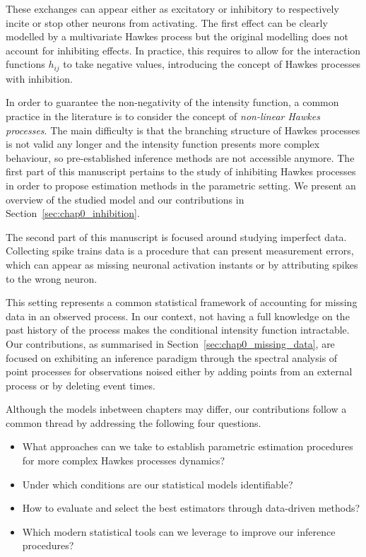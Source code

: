     These exchanges can appear either as excitatory or inhibitory to respectively incite or stop other neurons from activating.
    The first effect can be clearly modelled by a multivariate Hawkes process but the original modelling does not account for inhibiting effects.
    In practice, this requires to allow for the interaction functions $h_{ij}$ to take negative values, introducing the concept of Hawkes processes with inhibition.

    In order to guarantee the non-negativity of the intensity function, a common practice in the literature is to consider the concept of \emph{non-linear Hawkes processes}.
    The main difficulty is that the branching structure of Hawkes processes is not valid any longer and the intensity function presents more complex behaviour, so pre-established inference methods are not accessible anymore.
    The first part of this manuscript pertains to the study of inhibiting Hawkes processes in order to propose estimation methods in the parametric setting.
    We present an overview of the studied model and our contributions in Section~\ref{sec:chap0_inhibition}.
    
    The second part of this manuscript is focused around studying imperfect data.
    Collecting spike trains data is a procedure that can present measurement errors, which can appear as missing neuronal activation instants or by attributing spikes to the wrong neuron.

    This setting represents a common statistical framework of accounting for missing data in an observed process.
    In our context, not having a full knowledge on the past history of the process makes the conditional intensity function intractable.
    Our contributions, as summarised in Section~\ref{sec:chap0_missing_data}, are focused on exhibiting an inference paradigm through the spectral analysis of point processes for observations noised either by adding points from an external process or by deleting event times. 

    Although the models inbetween chapters may differ, our contributions follow a common thread by addressing the following four questions.
    \vspace{5mm}
    \begin{tcolorbox}
      \begin{itemize}
        \item What approaches can we take to establish parametric estimation procedures for more complex Hawkes processes dynamics?
        \item Under which conditions are our statistical models identifiable?
        \item How to evaluate and select the best estimators through data-driven methods?
        \item Which modern statistical tools can we leverage to improve our inference procedures?
      \end{itemize}
    \end{tcolorbox}
    
